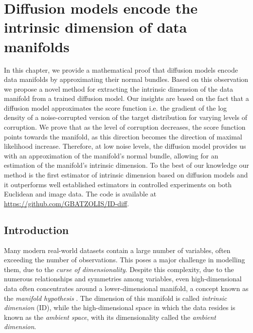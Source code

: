 \chapter{Diffusion models encode the intrinsic dimension of data manifolds}\label{Chapter:intrinsic-dimension}

\ifpdf
    \graphicspath{{Chapter3/Figs/Raster/}{Chapter3/Figs/PDF/}{Chapter3/Figs/}}
\else
    \graphicspath{{Chapter3/Figs/Vector/}{Chapter3/Figs/}}
\fi

In this chapter, we provide a mathematical proof that diffusion models encode data manifolds by approximating their normal bundles. Based on this observation we propose a novel method for extracting the intrinsic dimension of the data manifold from a trained diffusion model. Our insights are based  on the fact that a diffusion model approximates the score function i.e. the gradient of the log density of a noise-corrupted version of the target distribution for varying levels of corruption. We prove that as the level of corruption decreases, the score function points towards the manifold, as this direction becomes the direction of maximal likelihood increase. Therefore, at low noise levels, the diffusion model provides us with an approximation of the manifold's normal bundle, allowing for an estimation of the manifold's intrinsic dimension.  To the best of our knowledge our method is the first estimator of intrinsic dimension based on diffusion models and it outperforms well established estimators in controlled experiments on both Euclidean and image data. The code is available at \url{https://github.com/GBATZOLIS/ID-diff}.

\section{Introduction}\label{ch3:sec:introduction}

Many modern real-world datasets contain a large number of variables, often exceeding the number of observations. This poses a major challenge in modelling them, due to the \textit{curse of dimensionality}. Despite this complexity,  due to the numerous relationships and symmetries among variables, even high-dimensional data often concentrates around a lower-dimensional manifold, a concept known as the \textit{manifold hypothesis} 
\cite{manifold_hypothesis}. The dimension of this manifold is called \textit{intrinsic dimension} (ID),  while the high-dimensional space in which the data resides is known as the
\textit{ambient space}, with its dimensionality called the \textit{ambient dimension}.

